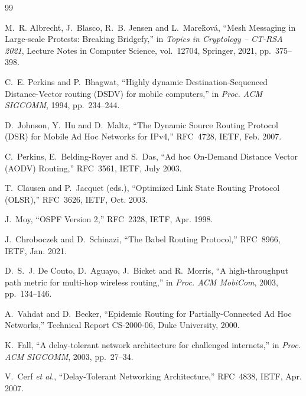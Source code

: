 \footnotesize
\begin{thebibliography}{99}
\setlength{\itemsep}{0.5pt}
M.~R. Albrecht, J.~Blasco, R.~B. Jensen and L.~Mare\v{k}ov\'a, ``Mesh Messaging in Large-scale Protests: Breaking Bridgefy,'' in \emph{Topics in Cryptology -- CT-RSA 2021}, Lecture Notes in Computer Science, vol.~12704, Springer, 2021, pp.~375--398.

C.~E. Perkins and P.~Bhagwat, ``Highly dynamic Destination-Sequenced Distance-Vector routing (DSDV) for mobile computers,'' in \emph{Proc. ACM SIGCOMM}, 1994, pp.~234--244.

D.~Johnson, Y.~Hu and D.~Maltz, ``The Dynamic Source Routing Protocol (DSR) for Mobile Ad Hoc Networks for IPv4,'' RFC~4728, IETF, Feb. 2007.

C.~Perkins, E.~Belding-Royer and S.~Das, ``Ad hoc On-Demand Distance Vector (AODV) Routing,'' RFC~3561, IETF, July 2003.

T.~Clausen and P.~Jacquet (eds.), ``Optimized Link State Routing Protocol (OLSR),'' RFC~3626, IETF, Oct. 2003.

J.~Moy, ``OSPF Version 2,'' RFC~2328, IETF, Apr. 1998.

J.~Chroboczek and D.~Schinazi, ``The Babel Routing Protocol,'' RFC~8966, IETF, Jan. 2021.

D.~S.~J. De Couto, D.~Aguayo, J.~Bicket and R.~Morris, ``A high-throughput path metric for multi-hop wireless routing,'' in \emph{Proc. ACM MobiCom}, 2003, pp.~134--146.

A.~Vahdat and D.~Becker, ``Epidemic Routing for Partially-Connected Ad Hoc Networks,'' Technical Report CS-2000-06, Duke University, 2000.

K.~Fall, ``A delay-tolerant network architecture for challenged internets,'' in \emph{Proc. ACM SIGCOMM}, 2003, pp.~27--34.

V.~Cerf \emph{et al.}, ``Delay-Tolerant Networking Architecture,'' RFC~4838, IETF, Apr. 2007.


\end{thebibliography}
